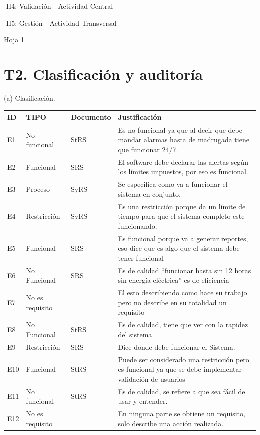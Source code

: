 \documentclass[11pt,a4paper]{article}
\begin{document}
-H4: Validación - Actividad Central

-H5: Gestión - Actividad Transversal

\hfill Hoja 1

\newpage

\section*{T2. Clasificación y auditoría}

(a) Clasificación.

\begin{longtable}{|p{1cm}|p{2.6cm}|p{2.2cm}|p{9cm}|}
\hline
\textbf{ID} & \textbf{TIPO} & \textbf{Documento} & \textbf{Justificación}\\
\hline
\endhead
E1 & No funcional & StRS & Es no funcional ya que al decir que debe mandar alarmas hasta de madrugada tiene que funcionar 24/7.\\
\hline
E2 & Funcional & SRS & El software debe declarar las alertas según los límites impuestos, por eso es funcional.\\
\hline
E3 & Proceso & SyRS & Se especifica como va a funcionar el sistema en conjunto.\\
\hline
E4 & Restricción & SyRS & Es una restricción porque da un límite de tiempo para que el sistema completo este funcionando.\\
\hline
E5 & Funcional & SRS & Es funcional porque va a generar reportes, eso dice que es algo que el sistema debe tener funcional\\
\hline
E6 & No Funcional & SRS & Es de calidad ``funcionar hasta sin 12 horas sin energía eléctrica'' es de eficiencia\\
\hline
E7 & No es requisito & & El esto describiendo como hace su trabajo pero no describe en su totalidad un requisito\\
\hline
E8 & No Funcional & StRS & Es de calidad, tiene que ver con la rapidez del sistema\\
\hline
E9 & Restricción & SRS & Dice donde debe funcionar el Sistema.\\
\hline
E10 & Funcional & StRS & Puede ser considerado una restricción pero es funcional ya que se debe implementar validación de usuarios\\
\hline
E11 & No funcional & StRS & Es de calidad, se refiere a que sea fácil de usar y entender.\\
\hline
E12 & No es requisito & & En ninguna parte se obtiene un requisito, solo describe una acción realizada.\\
\hline
\end{longtable}
\end{document}
